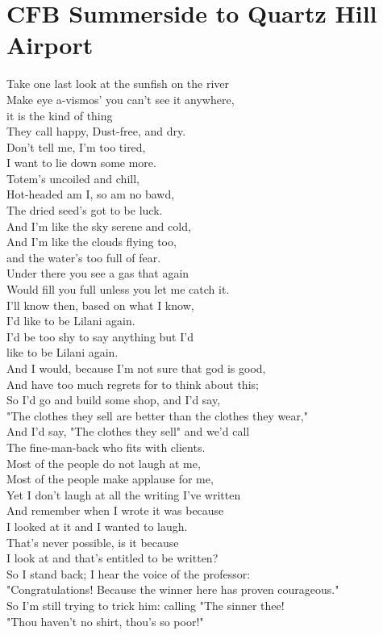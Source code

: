 \documentclass[smalldemyvopaper,11pt,twoside,onecolumn,openright,extrafontsizes]{memoir}
\begin{document}
\chapter{CFB Summerside to Quartz Hill Airport}
Take one last look at the sunfish on the river
\\Make eye a-vismos' you can't see it anywhere,
\\it is the kind of thing
\\They call happy, Dust-free, and dry.
\\Don't tell me, I'm too tired,
\\I want to lie down some more.
\\Totem's uncoiled and chill,
\\Hot-headed am I, so am no bawd,
\\The dried seed's got to be luck.
\\And I'm like the sky serene and cold,
\\And I'm like the clouds flying too,
\\and the water's too full of fear.
\\Under there you see a gas that again
\\Would fill you full unless you let me catch it.
\\I'll know then, based on what I know,
\\I'd like to be Lilani again.
\\I'd be too shy to say anything but I'd
\\like to be Lilani again.
\\And I would, because I'm not sure that god is good,
\\And have too much regrets for to think about this;
\\So I'd go and build some shop, and I'd say,
\\"The clothes they sell are better than the clothes they wear,"
\\And I'd say, "The clothes they sell" and we'd call
\\The fine-man-back who fits with clients.
\\Most of the people do not laugh at me,
\\Most of the people make applause for me,
\\Yet I don't laugh at all the writing I've written
\\And remember when I wrote it was because
\\I looked at it and I wanted to laugh.
\\That's never possible, is it because
\\I look at and that's entitled to be written?
\\So I stand back; I hear the voice of the professor:
\\"Congratulations! Because the winner here has proven courageous."
\\So I'm still trying to trick him: calling "The sinner thee!
\\"Thou haven't no shirt, thou's so poor!"
\end{document}
